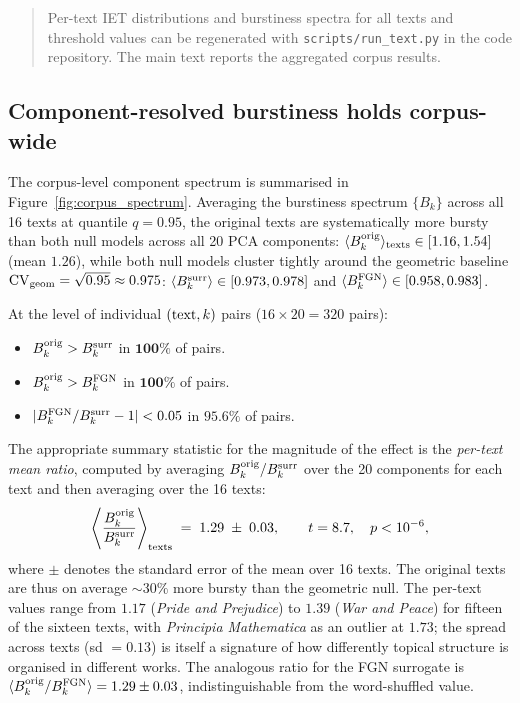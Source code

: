 \documentclass[12pt,a4paper]{article}
\newcommand{\bk}{B_k}
\newcommand{\CV}{\mathrm{CV}}
\begin{document}
\begin{quote}
Per-text IET distributions and burstiness spectra for all texts and
threshold values can be regenerated with \texttt{scripts/run\_text.py}
in the code repository. The main text reports the aggregated corpus
results.
\end{quote}



\subsection{Component-resolved burstiness holds corpus-wide}
\label{sec:corpus_ordering}

The corpus-level component spectrum is summarised in
Figure~\ref{fig:corpus_spectrum}.
Averaging the burstiness spectrum $\{\bk\}$ across all 16 texts
at quantile $q = 0.95$, the original texts are systematically more
bursty than both null models across all 20 PCA components:
$\langle B_k^{\rm orig}\rangle_{\rm texts} \in [1.16, 1.54]$
(mean $1.26$), while both null models cluster tightly around
the geometric baseline $\CV_{\rm geom} = \sqrt{0.95} \approx 0.975$:
$\langle B_k^{\rm surr}\rangle \in [0.973, 0.978]$ and
$\langle B_k^{\rm FGN}\rangle \in [0.958, 0.983]$.

At the level of individual $({\rm text}, k)$ pairs
($16 \times 20 = 320$ pairs):
\begin{itemize}
  \item $B_k^{\rm orig} > B_k^{\rm surr}$ in $\mathbf{100\%}$ of pairs.
  \item $B_k^{\rm orig} > B_k^{\rm FGN}$ in $\mathbf{100\%}$ of pairs.
  \item $|B_k^{\rm FGN}/B_k^{\rm surr} - 1| < 0.05$ in
        $\mathbf{95.6\%}$ of pairs.
\end{itemize}

The appropriate summary statistic for the magnitude of the effect
is the \emph{per-text mean ratio}, computed by averaging
$B_k^{\rm orig}/B_k^{\rm surr}$ over the 20 components for each
text and then averaging over the 16 texts:
\begin{equation}
  \left\langle \frac{B_k^{\rm orig}}{B_k^{\rm surr}}
  \right\rangle_{\rm texts}
  \;=\; 1.29 \;\pm\; 0.03,
  \qquad t = 8.7,\quad p < 10^{-6},
  \label{eq:ratio_corpus}
\end{equation}
where $\pm$ denotes the standard error of the mean over 16 texts.
The original texts are thus on average $\sim 30\%$ more bursty
than the geometric null. The per-text values range from $1.17$
(\emph{Pride and Prejudice}) to $1.39$ (\emph{War and Peace}) for
fifteen of the sixteen texts, with \emph{Principia Mathematica} as
an outlier at $1.73$; the spread across texts (sd $= 0.13$) is
itself a signature of how differently topical structure is organised
in different works.
The analogous ratio for the FGN surrogate is
$\langle B_k^{\rm orig}/B_k^{\rm FGN}\rangle = 1.29 \pm 0.03$,
indistinguishable from the word-shuffled value.
\end{document}
